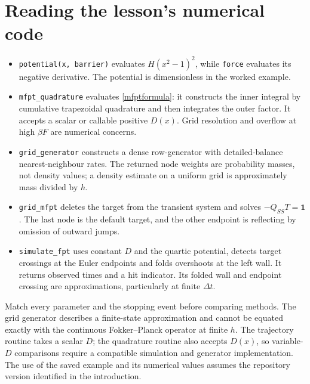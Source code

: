 \documentclass[11pt,a4paper]{article}
\theoremstyle{remark}\newtheorem*{remark}{Physical interpretation}
\begin{document}
\section{Reading the lesson's numerical code}
\begin{itemize}
\item[$\bullet$] \texttt{potential(x, barrier)} evaluates $H(x^2-1)^2$, while \texttt{force} evaluates its negative derivative. The potential is dimensionless in the worked example.
\item[$\bullet$] \verb|mfpt_quadrature| evaluates \eqref{mfptformula}: it constructs the inner integral by cumulative trapezoidal quadrature and then integrates the outer factor. It accepts a scalar or callable positive $D(x)$. Grid resolution and overflow at high $\beta F$ are numerical concerns.
\item[$\bullet$] \verb|grid_generator| constructs a dense row-generator with detailed-balance nearest-neighbour rates. The returned node weights are probability masses, not density values; a density estimate on a uniform grid is approximately mass divided by $h$.
\item[$\bullet$] \verb|grid_mfpt| deletes the target from the transient system and solves $-Q_{SS}T=\mathbf1$. The last node is the default target, and the other endpoint is reflecting by omission of outward jumps.
\item[$\bullet$] \verb|simulate_fpt| uses constant $D$ and the quartic potential, detects target crossings at the Euler endpoints and folds overshoots at the left wall. It returns observed times and a hit indicator. Its folded wall and endpoint crossing are approximations, particularly at finite $\Delta t$.
\end{itemize}
Match every parameter and the stopping event before comparing methods. The grid generator describes a finite-state approximation and cannot be equated exactly with the continuous Fokker--Planck operator at finite $h$. The trajectory routine takes a scalar $D$; the quadrature routine also accepts $D(x)$, so variable-$D$ comparisons require a compatible simulation and generator implementation. The use of the saved example and its numerical values assumes the repository version identified in the introduction.

\clearpage
\appendix
\end{document}
